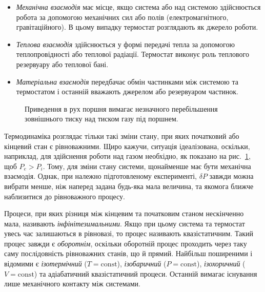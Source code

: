 \begin{itemize}
	\item \emph{Механічна взаємодія} має місце, якщо система або над системою здійснюється робота
	за
	      допомогою механічних сил або полів (електромагнітного, гравітаційного). В цьому випадку термостат
	      розглядають як джерело роботи.

	\item \emph{Теплова взаємодія} здійснюється у формі передачі тепла за допомогою теплопровідності
	      або теплової радіації. Термостат виконує роль теплового резервуару або теплової бані.

	\item \emph{Матеріальна взаємодія} передбачає обмін частинками між системою та термостатом і
	      останній вважають джерелом або резервуаром частинок.
\end{itemize}

\begin{figure}[h!]\centering
	
	\caption{Приведення в рух поршня вимагає незначного перебільшення зовнішнього тиску над тиском газу
		під поршнем.}
	\label{tikz:piston}
\end{figure}

Термодинаміка розглядає тільки такі зміни стану, при яких початковий або кінцевий стан є
рівноважними.
Щиро кажучи, ситуація ідеалізована, оскільки, наприклад, для здійснення роботи над газом
необхідно, як
показано на рис.~\ref{tikz:piston}, щоб $P_e > P_i$. Тому, для зміни стану системи, щонайменше
має бути
механічна
взаємодія. Однак, при належно підготовленому експерименті, $\delta P$ завжди можна вибрати менше, ніж
наперед задана будь-яка мала величина, та якомога ближче наблизитися  до рівноважного процесу.

Процеси, при яких різниця між кінцевим та початковим станом нескінченно мала, називають
\emph{інфінітезимальними}. Якщо при цьому система та термостат увесь час залишаються в рівновазі, то
процес називають квазістатичним. Такий процес завжди є \emph{оборотнім}, оскільки оборотній процес
проходить через таку саму послідовність рівноважних станів, що й прямий. Найбільш поширеними і
відомими є \emph{ізотермічний} ($T = \mathrm{const}$), \emph{ізобаричний} ($P = \mathrm{const}$),
\emph{ізохоричний} ($V = \mathrm{const}$) та адіабатичний квазістатичний процеси. Останній вимагає
існування лише механічного контакту між системами.

